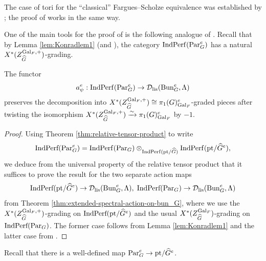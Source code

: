 \begin{rque}
    The case of tori for the ``classical'' Fargues--Scholze equivalence was established by \cite{Zou24}; the proof of  works in the same way. 
\end{rque}

One of the main tools for the proof of  is the following  analogue of \cite[Lemma 5.3.3]{Zou24}. Recall that by Lemma \ref{lem:Konradlem1} (and \cite[Proposition 4.3.1]{Zou24}), the category $\textnormal{Ind} \mathrm{Perf}(\mathrm{Par}_{G}^{e})$ has a natural $X^{*}(Z_{\widehat{G}}^{\mathrm{Gal}_{F},+})$-grading.

\begin{lem}\label{lem:gradedaction}
The functor
\begin{equation*}
a_{\psi}^e : \textnormal{Ind} \mathrm{Perf}(\mathrm{Par}_{G}^{e}) \to \mathcal{D}_{\textnormal{lis}}(\mathrm{Bun}_{G}^{e},\Lambda)
\end{equation*}
preserves the decomposition into $X^{*}(Z_{\widehat{G}}^{\mathrm{Gal}_{F},+}) \cong \pi_{1}(G)^{e}_{\mathrm{Gal}_{F}}$-graded pieces after twisting the isomorphism $X^{*}(Z_{\widehat{G}}^{\mathrm{Gal}_{F},+}) \xrightarrow{\sim} \pi_{1}(G)^{e}_{\mathrm{Gal}_{F}}$ by $-1$.
\end{lem}

\begin{proof}
    Using Theorem \ref{thm:relative-tensor-product} to write 
    \begin{equation*}
        \textnormal{IndPerf}(\mathrm{Par}_{G}^{e}) = \mathrm{Ind}\mathrm{Perf}(\mathrm{Par}_G) \otimes_{\mathrm{Ind}\mathrm{Perf}(\mathrm{pt}/\widehat{G})} \mathrm{Ind}\mathrm{Perf}(\mathrm{pt}/\widehat{G}^e),
    \end{equation*}
    we deduce from the universal property of the relative tensor product that it suffices to prove the result for the two separate action maps
    \begin{equation*}
        \textnormal{IndPerf}(\textnormal{pt}/\widehat{G}^{e}) \to \mathcal{D}_{\textnormal{lis}}(\mathrm{Bun}_{G}^{e},\Lambda), \hspace{1mm} \textnormal{IndPerf}(\mathrm{Par}_{G}) \to \mathcal{D}_{\textnormal{lis}}(\mathrm{Bun}_{G}^{e},\Lambda)
    \end{equation*}
    from Theorem \ref{thm:extended-spectral-action-on-bun_G}, where we use the $X^{*}(Z_{\widehat{G}}^{\mathrm{Gal}_{F},+})$-grading on $\textnormal{IndPerf}(\textnormal{pt}/\widehat{G}^{e})$ and the usual $X^{*}(Z_{\widehat{G}}^{\mathrm{Gal}_{F}})$-grading on $\textnormal{IndPerf}(\mathrm{Par}_{G})$. The former case follows from Lemma \ref{lem:Konradlem1} and the latter case from \cite[Lemma 5.3.2]{Zou24}.
\end{proof}

Recall that there is a well-defined map $\mathrm{Par}_G^e \to \mathrm{pt}/\widehat{G}^e$. 

